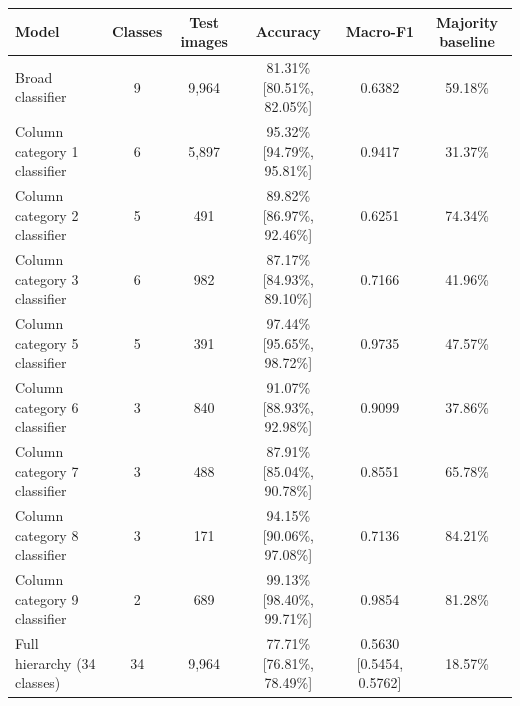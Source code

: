 \begin{tabular}{lccccc}
\toprule
\textbf{Model} & \textbf{Classes} & \textbf{Test images} & \textbf{Accuracy} & \textbf{Macro-F1} & \textbf{Majority baseline} \\
\midrule
Broad classifier & 9 & 9,964 & 81.31\% [80.51\%, 82.05\%] & 0.6382 & 59.18\% \\
\midrule
Column category 1 classifier & 6 & 5,897 & 95.32\% [94.79\%, 95.81\%] & 0.9417 & 31.37\% \\
Column category 2 classifier & 5 & 491 & 89.82\% [86.97\%, 92.46\%] & 0.6251 & 74.34\% \\
Column category 3 classifier & 6 & 982 & 87.17\% [84.93\%, 89.10\%] & 0.7166 & 41.96\% \\
Column category 5 classifier & 5 & 391 & 97.44\% [95.65\%, 98.72\%] & 0.9735 & 47.57\% \\
Column category 6 classifier & 3 & 840 & 91.07\% [88.93\%, 92.98\%] & 0.9099 & 37.86\% \\
Column category 7 classifier & 3 & 488 & 87.91\% [85.04\%, 90.78\%] & 0.8551 & 65.78\% \\
Column category 8 classifier & 3 & 171 & 94.15\% [90.06\%, 97.08\%] & 0.7136 & 84.21\% \\
Column category 9 classifier & 2 & 689 & 99.13\% [98.40\%, 99.71\%] & 0.9854 & 81.28\% \\
\midrule
Full hierarchy (34 classes) & 34 & 9,964 & 77.71\% [76.81\%, 78.49\%] & 0.5630 [0.5454, 0.5762] & 18.57\% \\
\bottomrule
\end{tabular}
